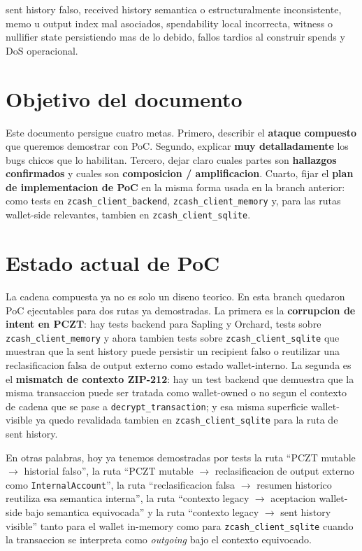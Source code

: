 \documentclass[11pt,a4paper]{article}
\begin{document}
sent history falso, received history semantica o estructuralmente
inconsistente, memo u output index mal asociados, spendability local
incorrecta, witness o nullifier state persistiendo mas de lo debido, fallos
tardios al construir spends y DoS operacional.

\section{Objetivo del documento}

Este documento persigue cuatro metas. Primero, describir el
\textbf{ataque compuesto} que queremos demostrar con PoC. Segundo, explicar
\textbf{muy detalladamente} los bugs chicos que lo habilitan. Tercero, dejar
claro cuales partes son \textbf{hallazgos confirmados} y cuales son
\textbf{composicion / amplificacion}. Cuarto, fijar el
\textbf{plan de implementacion de PoC} en la misma forma usada en la branch
anterior: como tests en \texttt{zcash\_client\_backend},
\texttt{zcash\_client\_memory} y, para las rutas wallet-side relevantes,
tambien en \texttt{zcash\_client\_sqlite}.

\section{Estado actual de PoC}

La cadena compuesta ya no es solo un diseno teorico. En esta branch quedaron
PoC ejecutables para dos rutas ya demostradas. La primera es la
\textbf{corrupcion de intent en PCZT}: hay tests backend para Sapling y
Orchard, tests sobre \texttt{zcash\_client\_memory} y ahora tambien tests
sobre \texttt{zcash\_client\_sqlite} que muestran que la sent history puede
persistir un recipient falso o reutilizar una reclasificacion falsa de output
externo como estado wallet-interno. La segunda es el
\textbf{mismatch de contexto ZIP-212}: hay un test backend que demuestra que la
misma transaccion puede ser tratada como wallet-owned o no segun el contexto
de cadena que se pase a \texttt{decrypt\_transaction}; y esa misma
superficie wallet-visible ya quedo revalidada tambien en
\texttt{zcash\_client\_sqlite} para la ruta de sent history.

En otras palabras, hoy ya tenemos demostradas por tests la ruta
``PCZT mutable $\rightarrow$ historial falso'', la ruta
``PCZT mutable $\rightarrow$ reclasificacion de output externo como
\texttt{InternalAccount}'', la ruta
``reclasificacion falsa $\rightarrow$ resumen historico reutiliza esa
semantica interna'', la ruta
``contexto legacy $\rightarrow$ aceptacion wallet-side bajo semantica
equivocada'' y la ruta
``contexto legacy $\rightarrow$ sent history visible'' tanto para el wallet
in-memory como para \texttt{zcash\_client\_sqlite} cuando la transaccion se
interpreta como \textit{outgoing} bajo el contexto equivocado.
\end{document}
